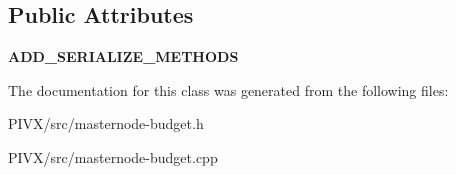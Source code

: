 \subsection*{Public Attributes}
\begin{DoxyCompactItemize}
\item 
\mbox{\label{class_c_budget_proposal_broadcast_ad5372e24fcfa7ba233702140908fd0f6}} 
{\bfseries A\+D\+D\+\_\+\+S\+E\+R\+I\+A\+L\+I\+Z\+E\+\_\+\+M\+E\+T\+H\+O\+DS}
\end{DoxyCompactItemize}


The documentation for this class was generated from the following files\+:\begin{DoxyCompactItemize}
\item 
P\+I\+V\+X/src/masternode-\/budget.\+h\item 
P\+I\+V\+X/src/masternode-\/budget.\+cpp\end{DoxyCompactItemize}
